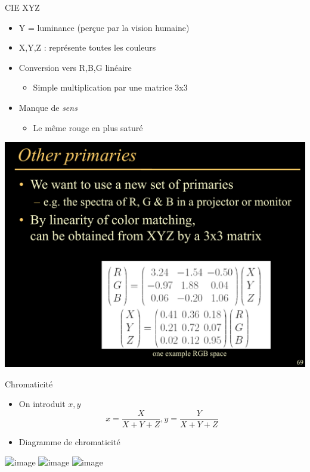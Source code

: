 \begin{frame}{CIE XYZ}
\begin{itemize}
\item Y = luminance (perçue par la vision humaine)
\item X,Y,Z : représente toutes les couleurs
\item Conversion vers R,B,G linéaire
\begin{itemize}
\item Simple multiplication par une matrice 3x3
\end{itemize}
\item Manque de \textit{sens}
\begin{itemize}
\item Le même rouge en plus saturé
\end{itemize}
\end{itemize}
\begin{center}
\includegraphics[height=.4\textheight]{figs/rgbxyz}
\end{center}
\end{frame}

\begin{frame}{Chromaticité}
\begin{itemize}
\item On introduit $x,y$
$$ x = \frac{X}{X+Y+Z}, y=\frac{Y}{X+Y+Z}$$
\item Diagramme de chromaticité
\end{itemize}
\begin{center}
\includegraphics<1>[height=.5\textheight]{figs/chromaticite.png}
\includegraphics<2>[height=.5\textheight]{figs/chromaticite2.png}
\includegraphics<3>[height=.5\textheight]{figs/chromaticite3.png}

\end{center}

\end{frame}


